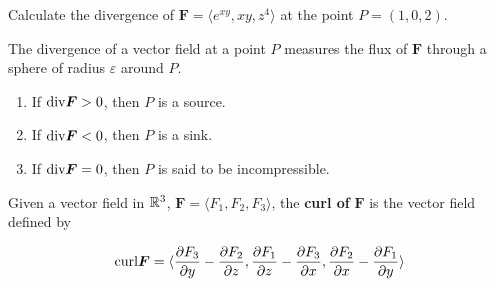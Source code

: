 \begin{example}
    Calculate the divergence of $\bm{F} = \langle e^{xy}, xy, z^4 \rangle$ at the point $P = (1,0,2)$.
\end{example}






\begin{remark}
    The divergence of a vector field at a point $P$ measures the flux of $\bm{F}$ through a sphere of radius $\varepsilon$ around $P$. 
    
    \begin{enumerate}
        \item If $\textnormal{div} \bm{F} > 0$, then $P$ is a source.
        \item If $\textnormal{div} \bm{F} < 0$, then $P$ is a sink.
        \item If $\textnormal{div} \bm{F} = 0$, then $P$ is said to be incompressible.
    \end{enumerate}
    \end{remark}
    


\begin{definition}
    Given a vector field in $\mathbb{R}^3$, $\bm{F} = \langle F_1, F_2, F_3 \rangle$, the \textbf{curl of} $\bm{F}$ is the vector field defined by 
    
    $$\textnormal{curl} \bm{F} = \langle \frac{\partial F_3}{\partial y} - \frac{\partial F_2}{\partial z}, \frac{\partial F_1}{\partial z} - \frac{\partial F_3}{\partial x}, \frac{\partial F_2}{\partial x} - \frac{\partial F_1}{\partial y} \rangle $$
    \end{definition}

